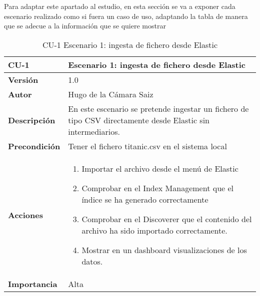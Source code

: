 Para adaptar este apartado al estudio, en esta sección se va a exponer cada escenario realizado como si fuera un caso de uso, adaptando la tabla de manera que se adecue a la información que se quiere mostrar
\begin{table}[p]
	\centering
	\begin{tabularx}{\linewidth}{ p{} p{} }
		\toprule
		\textbf{CU-1}    & \textbf{Escenario 1: ingesta de fichero desde Elastic}\\
		\toprule
		\textbf{Versión}              & 1.0    \\
		\textbf{Autor}                & Hugo de la Cámara Saiz \\
		\textbf{Descripción}          & En este escenario se pretende ingestar un fichero de tipo CSV directamente desde Elastic sin intermediarios. \\
		\textbf{Precondición}         & Tener el fichero titanic.csv en el sistema local \\
		\textbf{Acciones}             &
		\begin{enumerate}
			\def\labelenumi{\arabic{enumi}.}
			\tightlist
			\item Importar el archivo desde el menú de Elastic
                \item Comprobar en el Index Management que el índice se ha generado correctamente
			\item Comprobar en el Discoverer que el contenido del archivo ha sido importado correctamente.
                \item Mostrar en un dashboard visualizaciones de los datos.
		\end{enumerate}\\
		\textbf{Importancia}          & Alta \\
		\bottomrule
	\end{tabularx}
	\caption{CU-1 Escenario 1: ingesta de fichero desde Elastic}
\end{table}

